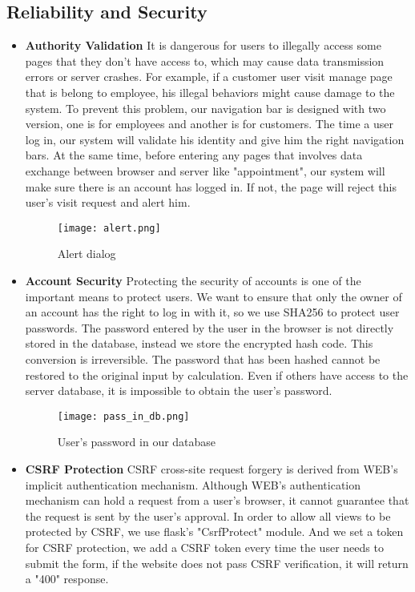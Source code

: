 \documentclass[a4paper]{article}
\begin{document}
\subsection{Reliability and Security}
\begin{itemize}
    \item \textbf{Authority Validation}
    \newline
    It is dangerous for users to illegally access some pages that they don't have access to, which may cause data transmission errors or server crashes. For example, if a customer user visit manage page that is belong to employee, his illegal behaviors might cause damage to the system. To prevent this problem, our navigation bar is designed with two version, one is for employees and another is for customers. The time a user log in, our system will validate his identity and give him the right navigation bars. At the same time, before entering any pages that involves data exchange between browser and server like "appointment", our system will make sure there is an account has logged in. If not, the page will reject this user's visit request and alert him.
    \begin{figure}[h]
         \centering
         \texttt{[image: alert.png]}
         \caption{Alert dialog}
         \label{alert_dialog}
     \end{figure}
    
    \item \textbf{Account Security}
    \newline
    Protecting the security of accounts is one of the important means to protect users. We want to ensure that only the owner of an account has the right to log in with it, so we use SHA256 to protect user passwords. The password entered by the user in the browser is not directly stored in the database, instead we store the encrypted hash code. This conversion is irreversible. The password that has been hashed cannot be restored to the original input by calculation. Even if others have access to the server database, it is impossible to obtain the user's password.
    \begin{figure}[h]
         \centering
         \texttt{[image: pass\_in\_db.png]}
         \caption{User's password in our database}
         \label{pass_in_db}
     \end{figure}
    \item \textbf{CSRF Protection}
    \newline
    CSRF cross-site request forgery is derived from WEB's implicit authentication mechanism. Although WEB's authentication mechanism can hold a request from a user's browser, it cannot guarantee that the request is sent by the user's approval. In order to allow all views to be protected by CSRF, we use flask's "CsrfProtect" module. And we set a token for CSRF protection, we add a CSRF token every time the user needs to submit the form, if the website does not pass CSRF verification, it will return a "400" response.
\end{itemize}
\end{document}

